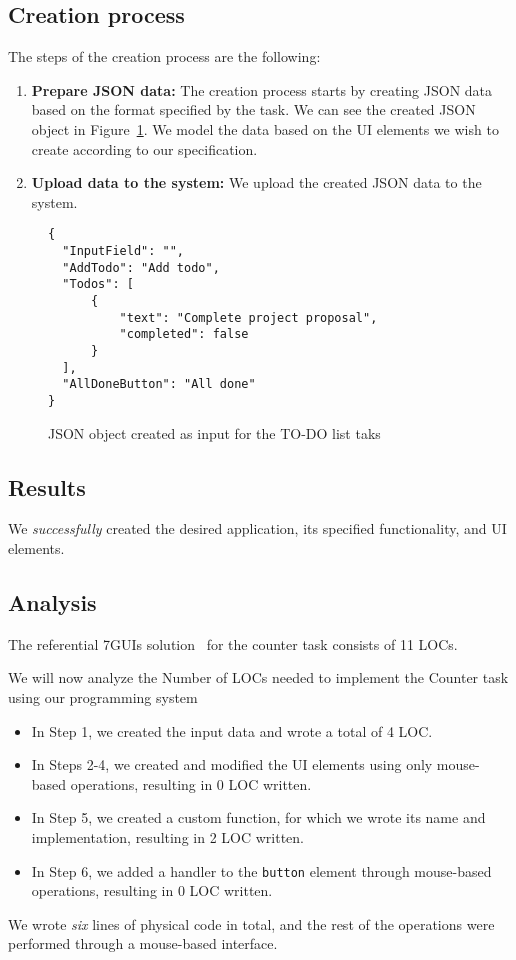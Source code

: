 \subsection{Creation process}

The steps of the creation process are the following:
\begin{enumerate}
	\item \textbf{Prepare JSON data:} The creation process starts by creating JSON data based on the format specified by the task.
	      We can see the created JSON object in Figure~\ref{fig:todo-json}.
	      We model the data based on the UI elements we wish to create according to our specification.
	\item \textbf{Upload data to the system:} We upload the created JSON data to the system.

\end{enumerate}


\begin{figure}[htbp]
	\caption{JSON object created as input for the TO-DO list taks}
	\label{fig:todo-json}
	\begin{lstlisting}
{
  "InputField": "",
  "AddTodo": "Add todo",
  "Todos": [
      {
          "text": "Complete project proposal",
          "completed": false
      }
  ],
  "AllDoneButton": "All done"
}
    \end{lstlisting}
\end{figure}


\subsection{Results}
We \emph{successfully} created the desired application, its specified functionality, and UI elements.

\subsection{Analysis}
The referential 7GUIs solution~\cite{7guis-React-TypeScript-MobX/src/app/guis/counter.tsx} for the counter task consists of 11 LOCs.

We will now analyze the Number of LOCs needed to implement the Counter task using our programming system
\begin{itemize}
	\item In Step 1, we created the input data and wrote a total of 4 LOC.
	\item   In Steps 2-4, we created and modified the UI elements using only mouse-based operations, resulting in 0 LOC written.
	\item   In Step 5, we created a custom function, for which we wrote its name and implementation, resulting in 2 LOC written.
	\item   In Step 6, we added a handler to the \texttt{button} element through mouse-based operations, resulting in 0 LOC written.
\end{itemize}
We wrote \emph{six} lines of physical code in total, and the rest of the operations were performed through a mouse-based interface.



